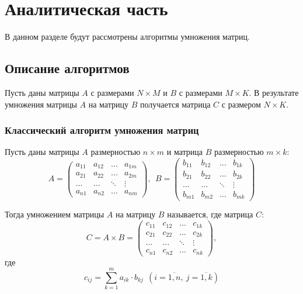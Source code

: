 \chapter{Аналитическая часть}

В данном разделе будут рассмотрены алгоритмы умножения матриц.

\section{Описание алгоритмов}

Пусть даны матрицы $A$ с размерами $N\times M$ и  $B$ с размерами $M\times K$.
В результате умножения матрицы $A$ на матрицу $B$ получается матрица  $C$ с размером
$N\times K$.


\subsection{Классический алгоритм умножения матриц}


Пусть даны матрицы $A$ размерностью  $n\times m$ и матрица $B$ размерностью  $m\times k$:
\begin{equation}
    A = 
\begin{pmatrix}
    a_{11} & a_{12} & \ldots & a_{1m} \\
    a_{21} & a_{22} & \ldots & a_{2m} \\
    \hdots & \hdots & \ddots & \vdots \\
    a_{n1} & a_{n2} & \ldots & a_{nm}
\end{pmatrix}, \ \
    B = 
\begin{pmatrix}
    b_{11} & b_{12} & \ldots & b_{1k} \\
    b_{21} & b_{22} & \ldots & b_{2k} \\
    \hdots & \hdots & \ddots & \vdots \\
    b_{m1} & b_{m2} & \ldots & b_{mk}
\end{pmatrix}
\end{equation}

Тогда умножением матрицы $A$ на матрицу  $B$ называется, где матрица $C$:
\begin{equation}
    C = A\times B =
\begin{pmatrix}
    c_{11} & c_{12} & \ldots & c_{1k} \\
    c_{21} & c_{22} & \ldots & c_{2k} \\
    \hdots & \hdots & \ddots & \vdots \\
    c_{n1} & c_{n2} & \ldots & c_{nk}
\end{pmatrix},
\end{equation}
где
\begin{equation}
    c_{ij} = \sum\limits_{k=1}^{m} a_{ik} \cdot b_{kj} \ \ (i = \overline{1,n}, \
    j = \overline{1,k})
\end{equation}


